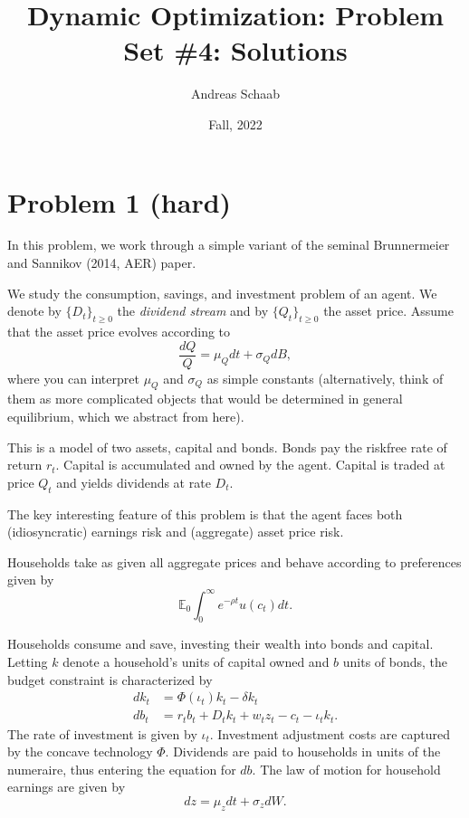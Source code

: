 \documentclass[11pt]{extarticle}
\title{Dynamic Optimization: Problem Set \#4: Solutions}
\author{Andreas Schaab}
\date{Fall, 2022}
\theoremstyle{plain}
\theoremstyle{definition}
\begin{document}
\maketitle
\thispagestyle{empty}
\setcounter{page}{0}


\vspace{10mm}
\section*{Problem 1 (hard)}

In this problem, we work through a simple variant of the seminal Brunnermeier and Sannikov (2014, AER) paper.

We study the consumption, savings, and investment problem of an agent. We denote by $\{ D_t \}_{t \geq 0}$ the \textit{dividend stream} and by $\{ Q_t \}_{t \geq 0}$ the asset price. Assume that the asset price evolves according to 
\begin{equation*}
	\frac{ dQ }{Q} = \mu_Q dt + \sigma_Q dB,
\end{equation*}
where you can interpret $\mu_Q$ and $\sigma_Q$ as simple constants (alternatively, think of them as more complicated objects that would be determined in general equilibrium, which we abstract from here).


This is a model of two assets, capital and bonds. Bonds pay the riskfree rate of return $r_t$. Capital is accumulated and owned by the agent. Capital is traded at price $Q_t$ and yields dividends at rate $D_t$.


The key interesting feature of this problem is that the agent faces both (idiosyncratic) earnings risk and (aggregate) asset price risk.


\vspace{10mm}
Households take as given all aggregate prices and behave according to preferences given by
\begin{equation*}
	\mathbb{E}_0 \int_0^\infty e^{- \rho t} u(c_t) dt.
\end{equation*}

Households consume and save, investing their wealth into bonds and capital. Letting $k$ denote a household's units of capital owned and $b$ units of bonds, the budget constraint is characterized by
\begin{align*}
	dk_t &= \Phi(\iota_t) k_t - \delta k_t \\
	db_t &= r_t b_t + D_t k_t + w_t z_t - c_t -  \iota_t k_t.
\end{align*}
The rate of investment is given by $\iota_t$. Investment adjustment costs are captured by the concave technology $\Phi$. Dividends are paid to households in units of the numeraire, thus entering the equation for $db$. The law of motion for household earnings are given by
\begin{equation*}
	dz = \mu_z dt + \sigma_z dW. 
\end{equation*}
\end{document}
